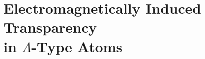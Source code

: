 \section[{Electromagnetically Induced Transparency in $\Lambda$-Type Atoms}]{Electromagnetically Induced Transparency\\ in $\Lambda$-Type Atoms}
  \label{sec:polaritons_eit}
